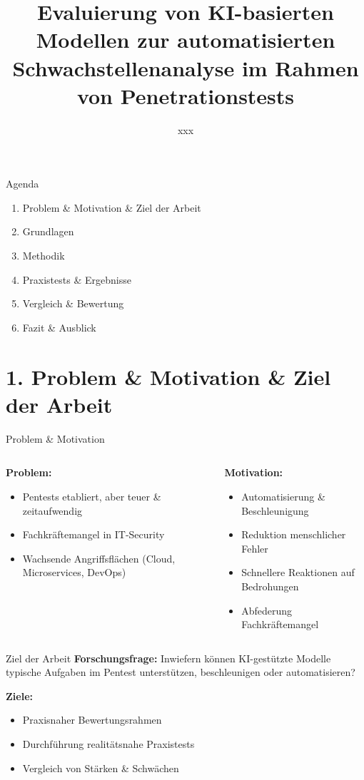 \documentclass[
	aspectratio=169,	%
	onlytextwidth,		%
	t,					%
	]{beamer}
\title{Evaluierung von KI-basierten Modellen zur automatisierten Schwachstellenanalyse im Rahmen von Penetrationstests}
\author[xxx]{xxx}
\begin{document}
	
\begin{frame}{Agenda}
	\begin{enumerate}
		\item Problem \& Motivation \& Ziel der Arbeit
		\item Grundlagen
		\item Methodik
		\item Praxistests \& Ergebnisse
		\item Vergleich \& Bewertung
		\item Fazit \& Ausblick
	\end{enumerate}
\end{frame}


\section{1. Problem \& Motivation \& Ziel der Arbeit}
\begin{frame}{Problem \& Motivation}
	\begin{columns}
		\begin{column}{0.48\textwidth}
			\textbf{Problem:}
			\begin{itemize}
				\item Pentests etabliert, aber teuer \& zeitaufwendig
				\item Fachkräftemangel in IT-Security
				\item Wachsende Angriffsflächen (Cloud, Microservices, DevOps)
			\end{itemize}
		\end{column}
		\begin{column}{0.48\textwidth}
			\textbf{Motivation:}
			\begin{itemize}
				\item Automatisierung \& Beschleunigung
				\item Reduktion menschlicher Fehler
				\item Schnellere Reaktionen auf Bedrohungen
				\item Abfederung Fachkräftemangel
			\end{itemize}
		\end{column}
	\end{columns}
\end{frame}




\begin{frame}{Ziel der Arbeit}
	\textbf{Forschungsfrage:}  
	Inwiefern können KI-gestützte Modelle typische Aufgaben im Pentest unterstützen, beschleunigen oder automatisieren?
	

	\textbf{Ziele:}
	\begin{itemize}
		\item Praxisnaher Bewertungsrahmen
		\item Durchführung realitätsnahe Praxistests
		\item Vergleich von Stärken \& Schwächen
	\end{itemize}
\end{frame}
\end{document}
